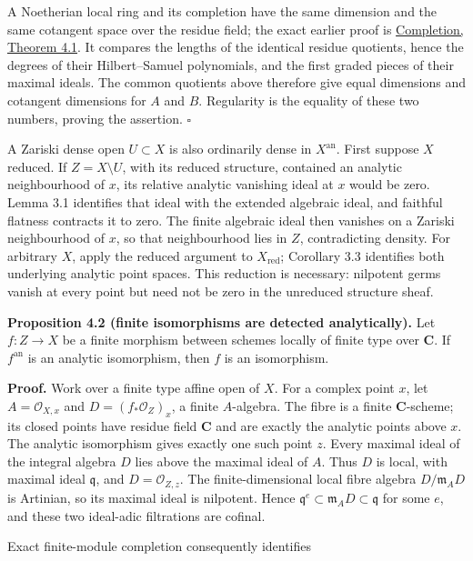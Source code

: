 \documentclass[11pt]{article}
\begin{document}
A Noetherian local ring and its completion have the same dimension and
the same cotangent space over the residue field; the exact earlier proof
is
\href{../../AG-CA/AG-CA-19.html\#4-local-dimension-and-regularity}{Completion,
Theorem 4.1}. It compares the lengths of the identical residue
quotients, hence the degrees of their Hilbert--Samuel polynomials, and
the first graded pieces of their maximal ideals. The common quotients
above therefore give equal dimensions and cotangent dimensions for \(A\)
and \(B\). Regularity is the equality of these two numbers, proving the
assertion. \(\square\)

A Zariski dense open \(U\subset X\) is also ordinarily dense in
\(X^{\mathrm{an}}\). First suppose \(X\) reduced. If \(Z=X\setminus U\),
with its reduced structure, contained an analytic neighbourhood of
\(x\), its relative analytic vanishing ideal at \(x\) would be zero.
Lemma 3.1 identifies that ideal with the extended algebraic ideal, and
faithful flatness contracts it to zero. The finite algebraic ideal then
vanishes on a Zariski neighbourhood of \(x\), so that neighbourhood lies
in \(Z\), contradicting density. For arbitrary \(X\), apply the reduced
argument to \(X_{\mathrm{red}}\); Corollary 3.3 identifies both
underlying analytic point spaces. This reduction is necessary: nilpotent
germs vanish at every point but need not be zero in the unreduced
structure sheaf.

\textbf{Proposition 4.2 (finite isomorphisms are detected
analytically).} Let \(f:Z\to X\) be a finite morphism between schemes
locally of finite type over \(\mathbf C\). If \(f^{\mathrm{an}}\) is an
analytic isomorphism, then \(f\) is an isomorphism.

\textbf{Proof.} Work over a finite type affine open of \(X\). For a
complex point \(x\), let \(A=\mathcal O_{X,x}\) and
\(D=(f_*\mathcal O_Z)_x\), a finite \(A\)-algebra. The fibre is a finite
\(\mathbf C\)-scheme; its closed points have residue field \(\mathbf C\)
and are exactly the analytic points above \(x\). The analytic
isomorphism gives exactly one such point \(z\). Every maximal ideal of
the integral algebra \(D\) lies above the maximal ideal of \(A\). Thus
\(D\) is local, with maximal ideal \(\mathfrak q\), and
\(D=\mathcal O_{Z,z}\). The finite-dimensional local fibre algebra
\(D/\mathfrak m_AD\) is Artinian, so its maximal ideal is nilpotent.
Hence \(\mathfrak q^e\subset\mathfrak m_AD\subset\mathfrak q\) for some
\(e\), and these two ideal-adic filtrations are cofinal.

Exact finite-module completion consequently identifies
\end{document}
